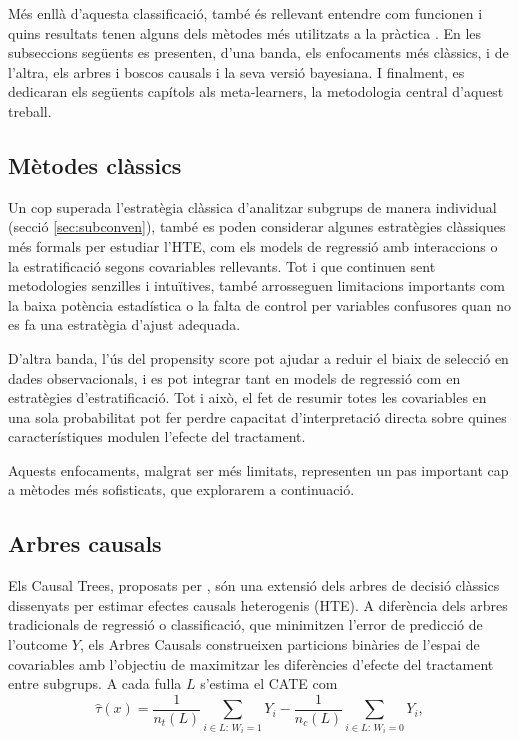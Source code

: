 \documentclass[../main.tex]{subfiles}
\begin{document}
     Més enllà d’aquesta classificació, també és rellevant entendre com funcionen i quins resultats tenen alguns dels mètodes més utilitzats a la pràctica \citep{inoue2024}. En les subseccions següents es presenten, d’una banda, els enfocaments més clàssics, i de l’altra, els arbres i boscos causals i la seva versió bayesiana. I finalment, es dedicaran els següents capítols als meta-learners, la metodologia central d’aquest treball.


    \subsection{Mètodes clàssics}\label{subsec:mclassic}
    Un cop superada l’estratègia clàssica d’analitzar subgrups de manera individual (secció \ref{sec:subconven}), també es poden considerar algunes estratègies clàssiques més formals per estudiar l’HTE, com els models de regressió amb interaccions o la estratificació segons covariables rellevants. Tot i que continuen sent metodologies senzilles i intuïtives, també arrosseguen limitacions importants com la baixa potència estadística o la falta de control per variables confusores quan no es fa una estratègia d'ajust adequada.\par
    D’altra banda, l’ús del propensity score pot ajudar a reduir el biaix de selecció en dades observacionals, i es pot integrar tant en models de regressió com en estratègies d’estratificació. Tot i això, el fet de resumir totes les covariables en una sola probabilitat pot fer perdre capacitat d’interpretació directa sobre quines característiques modulen l’efecte del tractament. \par
    Aquests enfocaments, malgrat ser més limitats, representen un pas important cap a mètodes més sofisticats, que explorarem a continuació.


    \subsection{Arbres causals} \label{subsec:CT}

    Els Causal Trees, proposats per \cite{athey2016CT}, són una extensió dels arbres de decisió clàssics dissenyats per estimar efectes causals heterogenis (HTE). A diferència dels arbres tradicionals de regressió o classificació, que minimitzen l’error de predicció de l’outcome $Y$, els Arbres Causals construeixen particions binàries de l’espai de covariables amb l’objectiu de maximitzar les diferències d’efecte del tractament entre subgrups. A cada fulla $L$ s’estima el CATE com
    \begin{equation}
    \hat{\tau}(x)=
    \frac{1}{n_t(L)}\sum_{i\in L:\,W_i=1}Y_i-
    \frac{1}{n_c(L)}\sum_{i\in L:\,W_i=0}Y_i,
    \end{equation}
\end{document}

